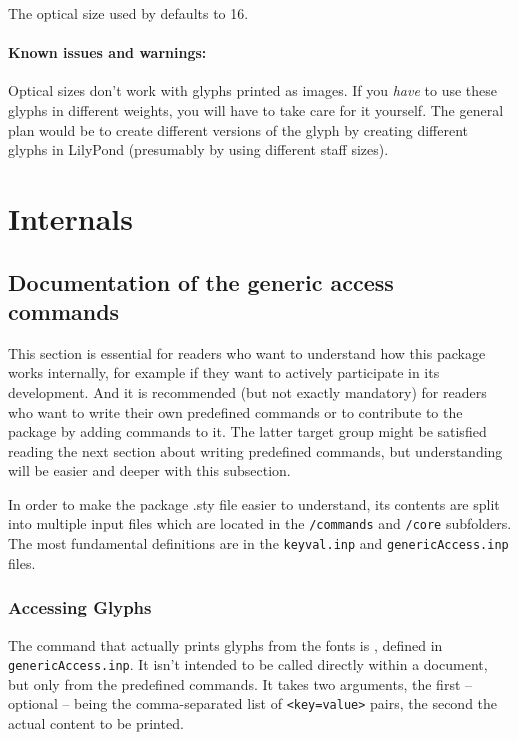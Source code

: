 \documentclass{article}
\begin{document}
The optical size used by \lilyglyphs defaults to 16.

\paragraph*{Known issues and warnings:}
Optical sizes don't work with glyphs printed as images.
If you \emph{have} to use these glyphs in different weights, you will have to take care for it yourself.
The general plan would be to create different versions of the glyph by creating different glyphs in LilyPond (presumably by using different staff sizes).

\section{Internals}
\label{sec:internals}

\subsection{Documentation of the generic access commands}
\label{subsec:internals_generic_access}
This section is essential for readers who want to understand how this package works internally, for example if they want to actively participate in its development.
And it is recommended (but not exactly mandatory) for readers who want to write their own predefined commands or to contribute to the package by adding commands to it. 
The latter target group might be satisfied reading the next section about writing predefined commands, but understanding will be easier and deeper with this subsection.

\medskip
In order to make the package .sty file easier to understand, its contents are split into multiple input files which are located in the \texttt{/commands} and \texttt{/core} subfolders.
The most fundamental definitions are in the \texttt{keyval.inp} and \texttt{genericAccess.inp} files.

\subsubsection{Accessing \emmentaler Glyphs}
\label{subsubsec:accessing_emmentaler_glyphs}
The command that actually prints glyphs from the \emmentaler fonts is , defined in \texttt{genericAccess.inp}.
It isn't intended to be called directly within a document, but only from the predefined commands.
It takes two arguments, the first -- optional -- being the comma-separated list of \texttt{<key=value>} pairs, the second the actual content to be printed.
\end{document}
